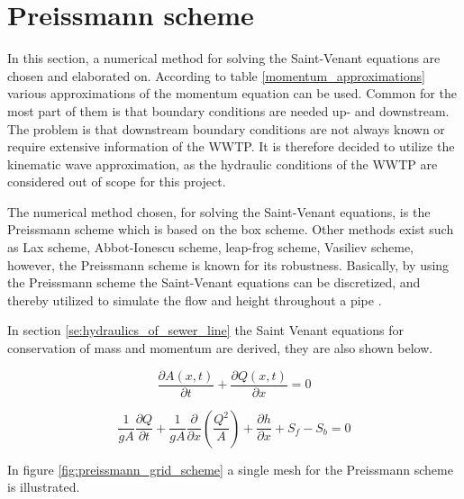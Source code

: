﻿\section{Preissmann scheme}\label{se:preissmann_scheme}
In this section, a numerical method for solving the Saint-Venant equations are chosen and elaborated on.
According to table \ref{momentum_approximations} various approximations of the momentum equation can be used. Common for the most part of them is that boundary conditions are needed up- and downstream. The problem is that downstream boundary conditions are not always known or require extensive information of the WWTP. It is therefore decided to utilize the kinematic wave approximation, as the hydraulic conditions of the WWTP are considered out of scope for this project.  

The numerical method chosen, for solving the Saint-Venant equations, is the Preissmann scheme which is based on the box scheme. Other methods exist such as Lax scheme, Abbot-Ionescu scheme, leap-frog scheme, Vasiliev scheme, however, the Preissmann scheme is known for its robustness. Basically, by using the Preissmann scheme the Saint-Venant equations can be discretized, and thereby utilized to simulate the flow and height throughout a pipe \cite{cunge1980practical}.

In section \ref{se:hydraulics_of_sewer_line} the Saint Venant equations for conservation of mass and momentum are derived, they are also shown below.

\begin{equation}\label{eq:saintbernard_mass_preiss}
\frac{\partial A(x,t)}{\partial t} + \frac{\partial Q(x,t)}{\partial x}=0
\end{equation}

\begin{equation}\label{eq:saintbernard_momentum_preiss}
\frac{1}{gA} \frac{\partial Q}{\partial t} +\frac{1}{gA}\frac{\partial}{\partial x} \left( \frac{Q^2}{A} \right) + \frac{\partial h}{\partial x} + S_f - S_b = 0
\end{equation}


In figure \ref{fig:preissmann_grid_scheme} a single mesh for the Preissmann scheme is illustrated.

